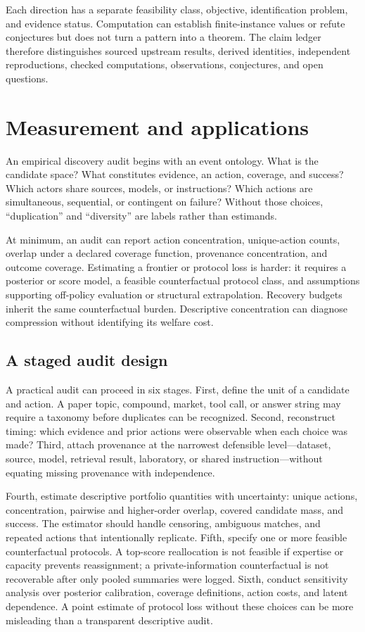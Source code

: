 \documentclass[11pt]{article}
\theoremstyle{remark}
\begin{document}
Each direction has a separate feasibility class, objective, identification problem, and evidence status. Computation can establish finite-instance values or refute conjectures but does not turn a pattern into a theorem. The claim ledger therefore distinguishes sourced upstream results, derived identities, independent reproductions, checked computations, observations, conjectures, and open questions.

\section{Measurement and applications}
An empirical discovery audit begins with an event ontology. What is the candidate space? What constitutes evidence, an action, coverage, and success? Which actors share sources, models, or instructions? Which actions are simultaneous, sequential, or contingent on failure? Without those choices, ``duplication'' and ``diversity'' are labels rather than estimands.

At minimum, an audit can report action concentration, unique-action counts, overlap under a declared coverage function, provenance concentration, and outcome coverage. Estimating a frontier or protocol loss is harder: it requires a posterior or score model, a feasible counterfactual protocol class, and assumptions supporting off-policy evaluation or structural extrapolation. Recovery budgets inherit the same counterfactual burden. Descriptive concentration can diagnose compression without identifying its welfare cost.

\subsection*{A staged audit design}
A practical audit can proceed in six stages. First, define the unit of a candidate and action. A paper topic, compound, market, tool call, or answer string may require a taxonomy before duplicates can be recognized. Second, reconstruct timing: which evidence and prior actions were observable when each choice was made? Third, attach provenance at the narrowest defensible level---dataset, source, model, retrieval result, laboratory, or shared instruction---without equating missing provenance with independence.

Fourth, estimate descriptive portfolio quantities with uncertainty: unique actions, concentration, pairwise and higher-order overlap, covered candidate mass, and success. The estimator should handle censoring, ambiguous matches, and repeated actions that intentionally replicate. Fifth, specify one or more feasible counterfactual protocols. A top-score reallocation is not feasible if expertise or capacity prevents reassignment; a private-information counterfactual is not recoverable after only pooled summaries were logged. Sixth, conduct sensitivity analysis over posterior calibration, coverage definitions, action costs, and latent dependence. A point estimate of protocol loss without these choices can be more misleading than a transparent descriptive audit.
\end{document}
